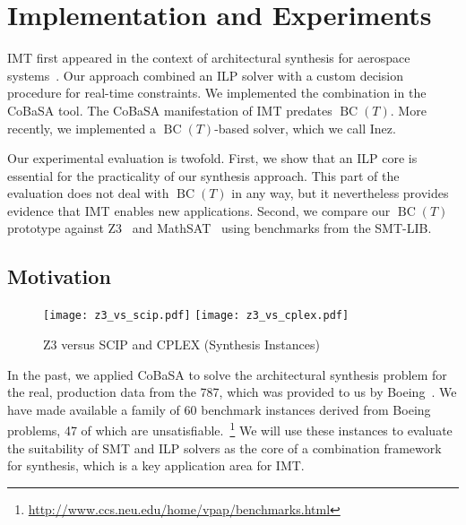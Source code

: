 \documentclass{llncs}
\newcommand{\cobasa}[0]{\textsf{CoBaSA}}
\newcommand{\inez}[0]{\textsf{Inez}}
\newcommand{\comment}[1]{}
\newcommand{\ie}[0]{\emph{i.e.}, }
\newcommand{\bct}[0]{\ensuremath{\operatorname{BC}(T)}}
\begin{document}
\comment{Modern ILP solvers provide an alternative called
  \emph{indicator constraints}~\footnote{\url{http://j.mp/NdkZZl}
    (CPLEX); \url{http://j.mp/NdlmDs} (SCIP)}, \ie natively supported
  constraints of the form , where  is a  variable. \bct{} does not
  explicitly provide indicator constraints, in order to stay within
  the standard formulation of ILP. }

\section{Implementation and Experiments}
\label{sec:experiments}

IMT first appeared in the context of architectural synthesis for
aerospace systems~\cite{hmp11}. Our approach combined an ILP solver
with a custom decision procedure for real-time constraints. We
implemented the combination in the \cobasa{} tool. The \cobasa{}
manifestation of IMT predates \bct{}. More recently, we implemented a
\bct{}-based solver, which we call \inez{}.

Our experimental evaluation is twofold. First, we show that an ILP
core is essential for the practicality of our synthesis approach. This
part of the evaluation does not deal with \bct{} in any way, but it
nevertheless provides evidence that IMT enables new
applications. Second, we compare our \bct{} prototype against
Z3~\cite{z3} and MathSAT~\cite{mathsatlia} using benchmarks from the
SMT-LIB.

\subsection{Motivation}

\begin{figure}[t]
\texttt{[image: z3\_vs\_scip.pdf]}
\texttt{[image: z3\_vs\_cplex.pdf]}
\caption{Z3 versus SCIP and CPLEX (Synthesis Instances)}
\label{fig:synthesis}
\end{figure}

In the past, we applied \cobasa{} to solve the architectural synthesis
problem for the real, production data from the 787, which was provided
to us by Boeing~\cite{hmp11}. We have made available a family of 60
benchmark instances derived from Boeing problems, 47 of which are
unsatisfiable.~\footnote{\url{http://www.ccs.neu.edu/home/vpap/benchmarks.html}}
We will use these instances to evaluate the suitability of SMT and ILP
solvers as the core of a combination framework for synthesis, which is
a key application area for IMT.
\end{document}
